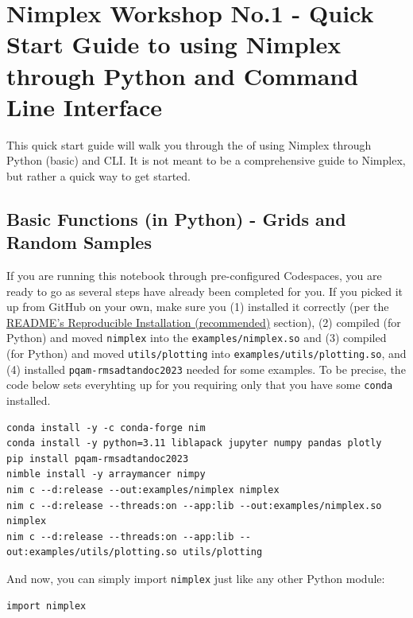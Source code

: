 \chapter{Nimplex Workshop No.1 - Quick Start Guide to using Nimplex through Python and Command Line Interface} \label{chap:nimplextutorial1}

This quick start guide will walk you through the of using Nimplex
through Python (basic) and CLI. It is not meant to be a comprehensive guide to Nimplex, but rather a quick way to get started.

\section{Basic Functions (in Python) - Grids and Random
Samples} 
\label{nimplextutorial1:basic-functions-in-python---grids-and-random-samples}

If you are running this notebook through pre-configured Codespaces, you
are ready to go as several steps have already been completed for you. If
you picked it up from GitHub on your own, make sure you (1) installed it
correctly (per the
\href{../README.md\#reproducible-installation-recommended}{README's
Reproducible Installation (recommended)} section), (2) compiled (for
Python) and moved \texttt{nimplex} into the
\texttt{examples/nimplex.so} and (3) compiled (for
Python) and moved \texttt{utils/plotting} into
\texttt{examples/utils/plotting.so}, and (4) installed
\texttt{pqam-rmsadtandoc2023} needed for some examples.
To be precise, the code below sets everyhting up for you requiring only
that you have some \texttt{conda} installed.

\begin{verbatim}
conda install -y -c conda-forge nim
conda install -y python=3.11 liblapack jupyter numpy pandas plotly
pip install pqam-rmsadtandoc2023
nimble install -y arraymancer nimpy
nim c --d:release --out:examples/nimplex nimplex
nim c --d:release --threads:on --app:lib --out:examples/nimplex.so nimplex
nim c --d:release --threads:on --app:lib --out:examples/utils/plotting.so utils/plotting
\end{verbatim}

And now, you can simply import \texttt{nimplex} just
like any other Python module:

\begin{verbatim}
import nimplex
\end{verbatim}

